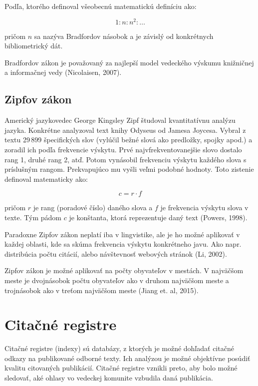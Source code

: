 Podľa, ktorého definoval všeobecnú matematickú definíciu ako:

\begin{equation}
\label{eq:bradfordov_zakon4}
1 : n : n^2 : \dotso
\end{equation}

pričom $n$ sa nazýva Bradfordov násobok a je závislý od konkrétnych
bibliometrický dát.

Bradfordov zákon je považovaný za najlepší model vedeckého výskumu knižničnej a
informačnej vedy (Nicolaisen, 2007).


\subsection{Zipfov zákon}

Americký jazykovedec George Kingsley Zipf študoval kvantitatívnu analýzu jazyka.
Konkrétne analyzoval text knihy Odyseus od Jamesa Joycesa.  Vybral z textu 29\,899 
špecifických slov (vylúčil bežné slová ako predložky, spojky apod.)  a
zoradil ich podľa frekvencie výskytu.  Prvé najvfrekventovanejšie slovo dostalo
rang 1, druhé rang 2, atď.  Potom vynásobil frekvenciu výskytu každého slova s
príslušným rangom.  Prekvapujúco mu vyšli veľmi podobné hodnoty.  Toto zistenie
definoval matematicky ako:

\begin{equation}
\label{eq:zipfov_zakon}
c = r \cdot f
\end{equation}

pričom $r$ je rang (poradové číslo) daného slova a $f$ je frekvencia výskytu
slova v texte.  Tým pádom $c$ je konštanta, ktorá reprezentuje daný text
(Powers, 1998).


Paradoxne Zipfov zákon neplatí iba v lingvistike, ale je ho možné aplikovať v
každej oblasti, kde sa skúma frekvencia výskytu konkrétneho javu.  Ako
napr.\,distribúcia počtu citácií, alebo návštevnosť webových stránok (Li, 2002).

Zipfov zákon je možné aplikovať na počty obyvateľov v mestách.  V najväčšom
meste je dvojnásobok počtu obyvateľov ako v druhom najväčšom meste a trojnásobok
ako v treťom najväčšom meste (Jiang et. al, 2015).


\section{Citačné registre}

Citačné registre (indexy) sú databázy, z ktorých je možné dohľadať citačné
odkazy na publikované odborné texty.  Ich analýzou je možné objektívne posúdiť
kvalitu citovaných publikácií.  Citačné registre vznikli preto, aby bolo možné
sledovať, aké ohlasy vo vedeckej komunite vzbudila daná publikácia.

